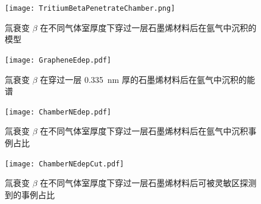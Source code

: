 \begin{figure}[htbp]
	\centering
	\texttt{[image: TritiumBetaPenetrateChamber.png]}
	\caption{氚衰变 $\beta$ 在不同气体室厚度下穿过一层石墨烯材料后在氩气中沉积的模型}
	\label{fig:TritiumBetaPenetrateGraphene}
\end{figure}

\begin{figure}[htbp]
	\centering
	\texttt{[image: GrapheneEdep.pdf]}
	\caption{氚衰变 $\beta$ 在穿过一层 \SI{0.335}{nm} 厚的石墨烯材料后在氩气中沉积的能谱}
	\label{fig:GrapheneEdep}
\end{figure}

\begin{figure}[htbp]
	\centering
	\texttt{[image: ChamberNEdep.pdf]}
	\caption{氚衰变 $\beta$ 在不同气体室厚度下穿过一层石墨烯材料后在氩气中沉积事例占比}
	\label{fig:ChamberThickness}
\end{figure}

\begin{figure}[htbp]
	\centering
	\texttt{[image: ChamberNEdepCut.pdf]}
	\caption{氚衰变 $\beta$ 在不同气体室厚度下穿过一层石墨烯材料后可被灵敏区探测到的事例占比}
	\label{fig:ChamberThicknessCut}
\end{figure}
